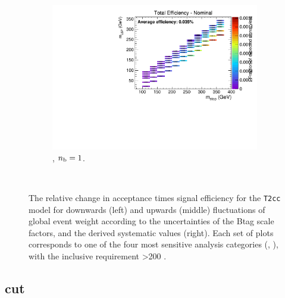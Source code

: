 \begin{figure}[ht!]
\begin{subfigure}[b]{0.32\textwidth}
    \includegraphics[width=\textwidth, page=6]{Figs/sms/t2cc/v24/bTag_T2cc_v24_eq1b_ge4j_incl.pdf}
    \caption{\njhigh, $n_{\text{b}} = 1$.}
  \end{subfigure}\\
  \caption{The relative change in acceptance times signal efficiency for the
  \texttt{T2cc} model for downwards (left) and upwards (middle) fluctuations
  of global event weight according to the uncertainties of the Btag scale 
  factors,
  and the derived systematic values (right). Each set of plots corresponds
  to one of the four most sensitive analysis categories (\nb, \nj), with the
  inclusive requirement \HT>200 \gev.}
  \label{fig:sms-btag-t2cc}
\end{figure}


\newpage
\subsection*{\mhtmet cut}
\label{sec:t2cc_mhtmet_plots}

